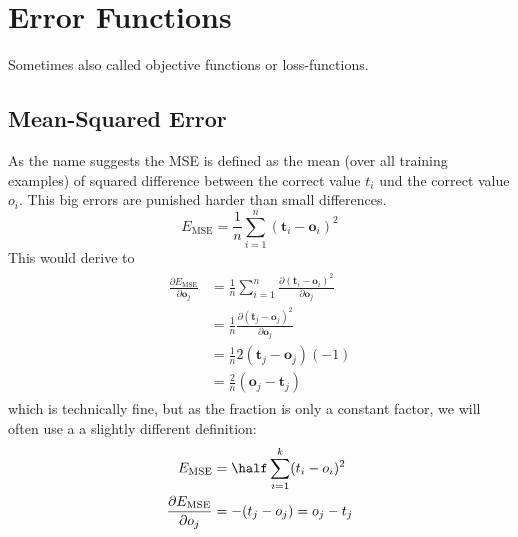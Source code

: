 \section{Error Functions}\label{sec:error-functions}
Sometimes also called objective functions or loss-functions.

\subsection{Mean-Squared Error}\label{sec:mse}
As the name suggests the \gls{MSE} is defined as the mean (over all training examples) of squared difference between the correct value $t_i$ und the correct value $o_i$. This big errors are punished harder than small differences.
\begin{equation}\label{eq:mse}
E_{\text{MSE}} = \frac{1}{n} \sum_{i=1}^n (\mathbf{t}_i - \mathbf{o}_i)^2
\end{equation}
This would derive to
\begin{align}
\begin{split}
\frac{\partial E_{\text{MSE}}}{\partial \mathbf{o}_j}
&= \frac{1}{n} \sum_{i=1}^n \frac{\partial (\mathbf{t}_i - \mathbf{o}_i)^2}{\partial \mathbf{o}_j}\\
&= \frac{1}{n} \frac{\partial (\mathbf{t}_j - \mathbf{o}_j)^2}{\partial \mathbf{o}_j}\\
&= \frac{1}{n} 2 (\mathbf{t}_j - \mathbf{o}_j) (-1)\\
&= \frac{2}{n} (\mathbf{o}_j - \mathbf{t}_j)
\end{split}
\end{align}
which is technically fine, but as the fraction is only a constant factor, we will often use a a slightly different definition:
\begin{align}\label{ed:mse2}
E_{\text{MSE}} &= \half \sum_{i=1}^k (t_i - o_i)^2\\
\frac{\partial E_{\text{MSE}}}{\partial o_j}
&= - (t_j - o_j) = o_j - t_j
\end{align}

